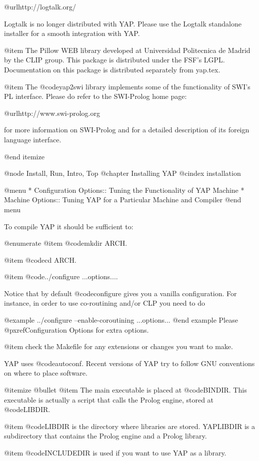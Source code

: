 @url{http://logtalk.org/}

Logtalk is no longer distributed with YAP. Please use the Logtalk standalone 
installer for a smooth integration with YAP.

@item The Pillow WEB library developed at Universidad Politecnica de
Madrid by the CLIP group. This package is distributed under the FSF's
LGPL. Documentation on this package is distributed separately from
yap.tex.

@item The @code{yap2swi} library implements some of the functionality of
SWI's PL interface. Please do refer to the SWI-Prolog home page:

@url{http://www.swi-prolog.org}

for more information on SWI-Prolog and for a detailed description of its
foreign language interface.

@end itemize

@node Install, Run, Intro, Top
@chapter Installing YAP
@cindex installation


@menu
* Configuration Options:: Tuning the Functionality of YAP Machine
* Machine Options:: Tuning YAP for a Particular Machine and Compiler
@end menu

To compile YAP it should be sufficient to:

@enumerate 
@item @code{mkdir ARCH}.

@item @code{cd ARCH}.

@item @code{../configure ...options...}. 

Notice that by default @code{configure} gives you a vanilla
configuration. For instance, in order to use co-routining and/or CLP
you need to do

@example
../configure --enable-coroutining ...options...
@end example
Please @pxref{Configuration Options} for extra options.

@item check the Makefile for any extensions or changes you want to
make.

YAP uses @code{autoconf}. Recent versions of YAP try to follow GNU
conventions on where to place software.

@itemize @bullet
@item The main executable is placed at @code{BINDIR}. This executable is
actually a script that calls the Prolog engine, stored at @code{LIBDIR}.

@item @code{LIBDIR} is the directory where libraries are stored. YAPLIBDIR is a
subdirectory that contains the Prolog engine and a Prolog library.

@item @code{INCLUDEDIR} is used if you want to use YAP as a library.

